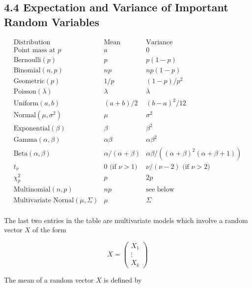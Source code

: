 \subsection{4.4 Expectation and Variance of Important Random
Variables}\label{expectation-and-variance-of-important-random-variables}

\[
\begin{array}{lll}
\text{Distribution} & \text{Mean} & \text{Variance}           \\
\hline
\text{Point mass at } p      & a             & 0              \\
\text{Bernoulli}(p)          & p             & p(1-p)         \\
\text{Binomial}(n, p)        & np            & np(1-p)        \\
\text{Geometric}(p)          & 1/p           & (1 - p)/p^2    \\
\text{Poisson}(\lambda)      & \lambda       & \lambda        \\
\text{Uniform}(a, b)         & (a + b) / 2   & (b - a)^2 / 12 \\
\text{Normal}(\mu, \sigma^2) & \mu           & \sigma^2       \\
\text{Exponential}(\beta)    & \beta         & \beta^2        \\
\text{Gamma}(\alpha, \beta)  & \alpha \beta  & \alpha \beta^2 \\
\text{Beta}(\alpha, \beta)   & \alpha / (\alpha + \beta) & \alpha \beta / ((\alpha + \beta)^2 (\alpha + \beta + 1)) \\
t_\nu                        & 0 \text{ (if } \nu > 1 \text{)} & \nu / (\nu - 2) \text{ (if } \nu > 2 \text{)} \\
\chi^2_p                     & p             & 2p             \\
\text{Multinomial}(n, p)     & np            & \text{see below} \\
\text{Multivariate Nornal}(\mu, \Sigma) & \mu & \Sigma \\
\end{array}
\]

The last two entries in the table are multivariate models which involve
a random vector \(X\) of the form

\[ X = \begin{pmatrix} X_1 \\ \vdots \\ X_k \end{pmatrix} \]

The mean of a random vector \(X\) is defined by

